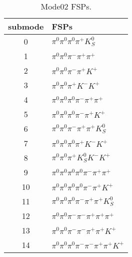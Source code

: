 \begin{table}[h!]
\begin{center}
\begin{tabular}{cl}
\hline
submode& FSPs\\
\hline
0 & $\pi^0 \pi^0 \pi^0 \pi^+ K_S^0 $ \\
1 & $\pi^0 \pi^0 \pi^- \pi^+ \pi^+ $ \\
2 & $\pi^0 \pi^0 \pi^- \pi^+ K^+ $ \\
3 & $\pi^0 \pi^0 \pi^+ K^- K^+ $ \\
4 & $\pi^0 \pi^0 \pi^0 \pi^- \pi^+ \pi^+ $ \\
5 & $\pi^0 \pi^0 \pi^0 \pi^- \pi^+ K^+ $ \\
6 & $\pi^0 \pi^0 \pi^- \pi^+ \pi^+ K_S^0 $ \\
7 & $\pi^0 \pi^0 \pi^0 \pi^+ K^- K^+ $ \\
8 & $\pi^0 \pi^0 \pi^+ K_S^0 K^- K^+ $ \\
9 & $\pi^0 \pi^0 \pi^0 \pi^0 \pi^- \pi^+ \pi^+ $ \\
10 & $\pi^0 \pi^0 \pi^0 \pi^0 \pi^- \pi^+ K^+ $ \\
11 & $\pi^0 \pi^0 \pi^0 \pi^- \pi^+ \pi^+ K_S^0 $ \\
12 & $\pi^0 \pi^0 \pi^- \pi^- \pi^+ \pi^+ \pi^+ $ \\
13 & $\pi^0 \pi^0 \pi^- \pi^- \pi^+ \pi^+ K^+ $ \\
14 & $\pi^0 \pi^0 \pi^0 \pi^- \pi^- \pi^+ \pi^+ K^+ $ \\
\hline
\end{tabular}
\label{tab:Mode02FSPs}
\caption{Mode02 FSPs.}
\end{center}
\end{table}
